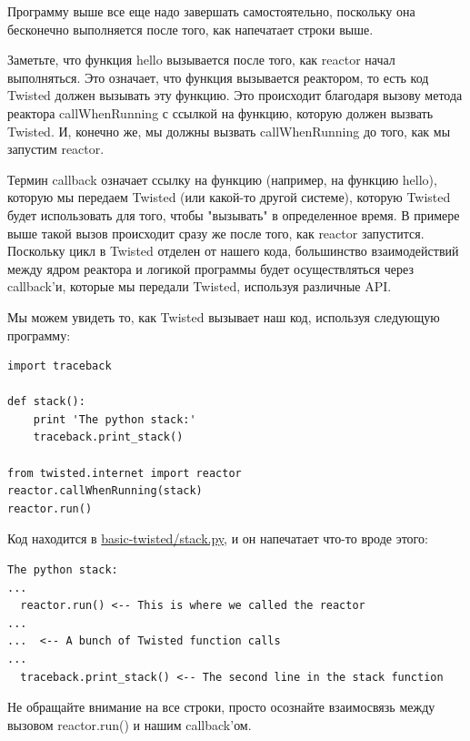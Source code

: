 Программу выше все еще надо завершать самостоятельно, 
поскольку она бесконечно выполняется после того, как напечатает 
строки выше.


Заметьте, что функция hello вызывается после того, как reactor 
начал выполняться. Это означает, что функция вызывается 
реактором, то есть код Twisted должен вызывать эту функцию. 
Это происходит благодаря вызову метода реактора callWhenRunning с 
ссылкой на функцию, которую должен вызвать Twisted. И, конечно же, 
мы должны вызвать callWhenRunning до того, как мы запустим 
reactor.


Термин callback означает ссылку на функцию (например, на 
функцию hello), которую мы 
передаем Twisted (или какой-то другой системе), 
которую Twisted будет использовать для того, чтобы "вызывать"  
в определенное время. В примере выше такой вызов происходит 
сразу же после того, как reactor запустится. Поскольку 
цикл в Twisted отделен от нашего кода, большинство 
взаимодействий между ядром реактора и логикой программы 
будет осуществляться через callback'и, которые 
мы передали Twisted, используя различные API.   


Мы можем увидеть то, как Twisted вызывает наш код, 
используя следующую программу:

\begin{scriptsize}\begin{verbatim}
import traceback

def stack():
    print 'The python stack:'
    traceback.print_stack()

from twisted.internet import reactor
reactor.callWhenRunning(stack)
reactor.run()
\end{verbatim}\end{scriptsize}


Код находится в 
\href{http://github.com/jdavisp3/twisted-intro/blob/master/basic-twisted/stack.py}{basic-twisted/stack.py}, 
и он напечатает что-то вроде этого:

\begin{scriptsize}\begin{verbatim}
The python stack:
...
  reactor.run() <-- This is where we called the reactor
...
...  <-- A bunch of Twisted function calls
...
  traceback.print_stack() <-- The second line in the stack function
\end{verbatim}\end{scriptsize}


Не обращайте внимание на все строки, просто 
осознайте взаимосвязь между вызовом  reactor.run() и 
нашим callback'ом. 


